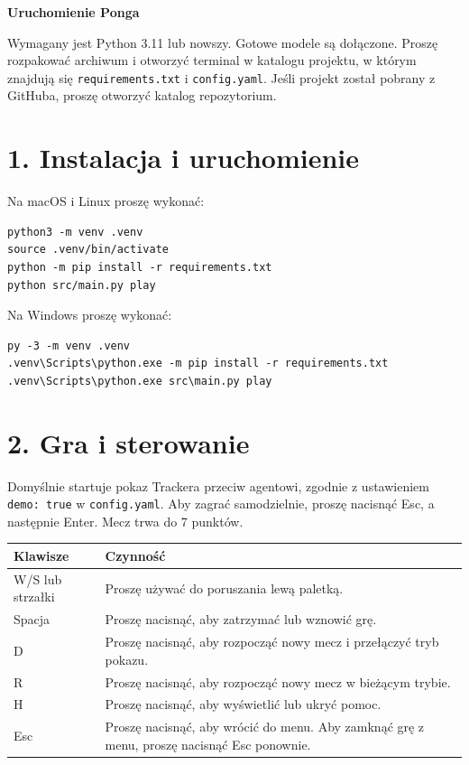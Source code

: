 \documentclass[11pt,a4paper]{article}
\begin{document}
{\LARGE\bfseries Uruchomienie Ponga\par}

Wymagany jest Python 3.11 lub nowszy. Gotowe modele są dołączone.
Proszę rozpakować archiwum i otworzyć terminal w katalogu projektu,
w którym znajdują się \texttt{requirements.txt} i \texttt{config.yaml}.
Jeśli projekt został pobrany z GitHuba, proszę otworzyć katalog repozytorium.

\section*{1. Instalacja i uruchomienie}
Na macOS i Linux proszę wykonać:
\begin{verbatim}
python3 -m venv .venv
source .venv/bin/activate
python -m pip install -r requirements.txt
python src/main.py play
\end{verbatim}
Na Windows proszę wykonać:
\begin{verbatim}
py -3 -m venv .venv
.venv\Scripts\python.exe -m pip install -r requirements.txt
.venv\Scripts\python.exe src\main.py play
\end{verbatim}

\section*{2. Gra i sterowanie}
Domyślnie startuje pokaz Trackera przeciw agentowi, zgodnie z ustawieniem
\texttt{demo: true} w \texttt{config.yaml}. Aby zagrać samodzielnie,
proszę nacisnąć Esc, a następnie Enter. Mecz trwa do 7 punktów.

\renewcommand{\arraystretch}{1.15}
\begin{tabularx}{\linewidth}{@{}lX@{}}
\toprule
Klawisze & Czynność\\
\midrule
W/S lub strzałki & Proszę używać do poruszania lewą paletką.\\
Spacja & Proszę nacisnąć, aby zatrzymać lub wznowić grę.\\
D & Proszę nacisnąć, aby rozpocząć nowy mecz i przełączyć tryb pokazu.\\
R & Proszę nacisnąć, aby rozpocząć nowy mecz w bieżącym trybie.\\
H & Proszę nacisnąć, aby wyświetlić lub ukryć pomoc.\\
Esc & Proszę nacisnąć, aby wrócić do menu. Aby zamknąć grę z menu,
proszę nacisnąć Esc ponownie.\\
\bottomrule
\end{tabularx}
\end{document}
